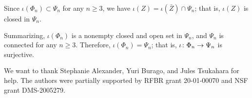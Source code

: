Since $\iota(\Phi_n)\subset \Psi_n$ for any $n\ge 3$, we have  $\iota (Z)=\iota(\bar Z)\cap \Psi_n$;
that is, $\iota (Z)$ is closed in $\Psi_n$. 

\medskip

Summarizing, $\iota(\Phi_n)$ is a nonempty closed and open set in $\Psi_n$, and $\Psi_n$ is connected for any $n\ge 3$.
Therefore, $\iota(\Phi_n)=\Psi_n$; that is, $\iota\:\Phi_n\z\to\Psi_n$ is surjective.
\qeds

 We want to thank Stephanie Alexander, Yuri Burago, and Jules %
Tsukahara for help. 
The authors were partially supported by RFBR grant 20-01-00070 and NSF grant DMS-2005279.

\sloppy
\printbibliography[heading=bibintoc]
\fussy


